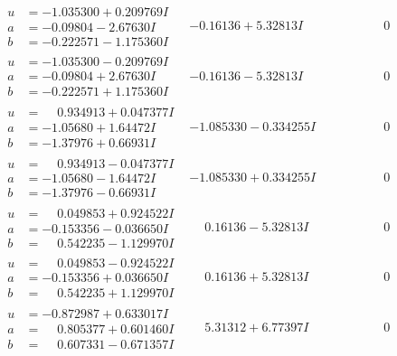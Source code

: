 \documentclass[1p]{elsarticle_modified}
\theoremstyle{definition}
\begin{document}
$$\begin{array}{c|c|c}
\begin{aligned}
u &= -1.035300 + 0.209769 I \\
a &= -0.09804 - 2.67630 I \\
b &= -0.222571 - 1.175360 I\end{aligned}
 & -0.16136 + 5.32813 I & \phantom{-0.000000 } 0 \\ \hline\begin{aligned}
u &= -1.035300 - 0.209769 I \\
a &= -0.09804 + 2.67630 I \\
b &= -0.222571 + 1.175360 I\end{aligned}
 & -0.16136 - 5.32813 I & \phantom{-0.000000 } 0 \\ \hline\begin{aligned}
u &= \phantom{-}0.934913 + 0.047377 I \\
a &= -1.05680 + 1.64472 I \\
b &= -1.37976 + 0.66931 I\end{aligned}
 & -1.085330 - 0.334255 I & \phantom{-0.000000 } 0 \\ \hline\begin{aligned}
u &= \phantom{-}0.934913 - 0.047377 I \\
a &= -1.05680 - 1.64472 I \\
b &= -1.37976 - 0.66931 I\end{aligned}
 & -1.085330 + 0.334255 I & \phantom{-0.000000 } 0 \\ \hline\begin{aligned}
u &= \phantom{-}0.049853 + 0.924522 I \\
a &= -0.153356 - 0.036650 I \\
b &= \phantom{-}0.542235 - 1.129970 I\end{aligned}
 & \phantom{-}0.16136 - 5.32813 I & \phantom{-0.000000 } 0 \\ \hline\begin{aligned}
u &= \phantom{-}0.049853 - 0.924522 I \\
a &= -0.153356 + 0.036650 I \\
b &= \phantom{-}0.542235 + 1.129970 I\end{aligned}
 & \phantom{-}0.16136 + 5.32813 I & \phantom{-0.000000 } 0 \\ \hline\begin{aligned}
u &= -0.872987 + 0.633017 I \\
a &= \phantom{-}0.805377 + 0.601460 I \\
b &= \phantom{-}0.607331 - 0.671357 I\end{aligned}
 & \phantom{-}5.31312 + 6.77397 I & \phantom{-0.000000 } 0 \\ \hline\begin{aligned}

\end{aligned}
\end{array}$$
\end{document}
